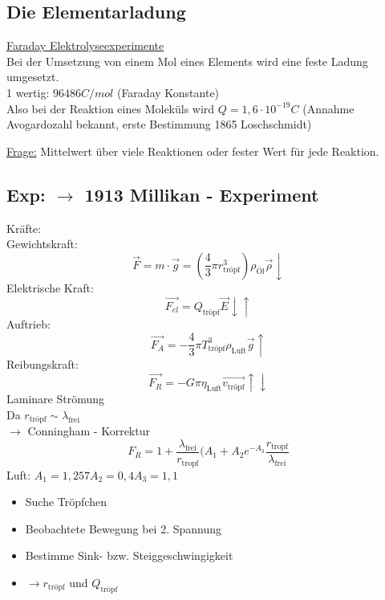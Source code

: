 \documentclass[titlepage,12pt,a4paper,ngerman]{report}
\newcommand{\tx}[1]{\textrm{#1}}
\begin{document}
\subsection{Die Elementarladung}
{\large \underline{Faraday Elektrolyseexperimente}}\\
Bei der Umsetzung von einem Mol eines Elements wird eine feste Ladung umgesetzt.\\
1 wertig: $96486 C/mol$ (Faraday Konstante)\\
Also bei der Reaktion eines Moleküls wird $Q=1,6\cdot 10^{-19} C$ (Annahme Avogardozahl bekannt, erste Bestimmung 1865 Loschschmidt)\par
{\large \underline{Frage:}} Mittelwert über viele Reaktionen oder fester Wert für jede Reaktion.
\subsection*{Exp: $\rightarrow$ 1913 Millikan - Experiment}
Kräfte:\\
Gewichtskraft: $$\vec{F}=m\cdot \vec{g}=(\frac{4}{3}\pi r_{\textrm{tröpf}}^3)\rho_{\textrm{Öl}}\vec{\rho} \downarrow$$
Elektrische Kraft: $$\vec{F_{el}}=Q_{\textrm{tröpf}}\vec{E}\downarrow \uparrow$$
Auftrieb: $$\vec{F_A}=-\frac{4}{3}\pi T^3_{\textrm{tröpf}} \rho_{\tx{Luft}} \vec{g} \uparrow$$
Reibungskraft: $$\vec{F_R}=-G \pi \eta_{\tx{Luft}} \vec{v_{\textrm{tröpf}}} \uparrow \downarrow $$
Laminare Strömung\\
Da $r_{\textrm{tröpf}} \sim \lambda_{\tx{frei}} $\\
$\rightarrow $ Conningham - Korrektur
$$F_R = 1+\frac{\lambda_{\tx{frei}}}{r_{\tx{tropf}}} (A_1 +A_2 e^{-A_3} \frac{r_{\tx{tropf}}}{\lambda_{\tx{frei}}}$$
Luft: $A_1 = 1,257 A_2=0,4 A_3 = 1,1$
\begin{itemize}
\item Suche Tröpfchen
\item Beobachtete Bewegung bei 2. Spannung
\item Bestimme Sink- bzw. Steiggeschwingigkeit
\item $\rightarrow r_{\textrm{tröpf}}$ und $ Q_{\textrm{tröpf}}$
\end{itemize}
\end{document}
